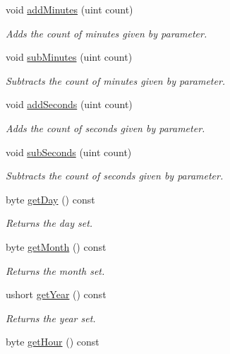 \begin{DoxyCompactItemize}
void \mbox{\hyperlink{class_date_time_a1da975e9de48724cc5c0b08dbfdb1b3c}{add\+Minutes}} (uint count)
\begin{DoxyCompactList}\small\item\em Adds the count of minutes given by parameter. \end{DoxyCompactList}\item 
void \mbox{\hyperlink{class_date_time_a5046fae9b637fc3dc994fb5544133585}{sub\+Minutes}} (uint count)
\begin{DoxyCompactList}\small\item\em Subtracts the count of minutes given by parameter. \end{DoxyCompactList}\item 
void \mbox{\hyperlink{class_date_time_a79bda8c555092ea62255498f86a07655}{add\+Seconds}} (uint count)
\begin{DoxyCompactList}\small\item\em Adds the count of seconds given by parameter. \end{DoxyCompactList}\item 
void \mbox{\hyperlink{class_date_time_a985cb277733445af6b172ac9ec2630e9}{sub\+Seconds}} (uint count)
\begin{DoxyCompactList}\small\item\em Subtracts the count of seconds given by parameter. \end{DoxyCompactList}\item 
byte \mbox{\hyperlink{class_date_time_a3ffb237255a73bbe9f8000d18c870ea8}{get\+Day}} () const
\begin{DoxyCompactList}\small\item\em Returns the day set. \end{DoxyCompactList}\item 
byte \mbox{\hyperlink{class_date_time_a18d5987a6def22fa88302cdb50941add}{get\+Month}} () const
\begin{DoxyCompactList}\small\item\em Returns the month set. \end{DoxyCompactList}\item 
ushort \mbox{\hyperlink{class_date_time_a5bab8648961a46a2a3cbca3868efecce}{get\+Year}} () const
\begin{DoxyCompactList}\small\item\em Returns the year set. \end{DoxyCompactList}\item 
byte \mbox{\hyperlink{class_date_time_ada00db60b48e636102d509a7b1b30296}{get\+Hour}} () const

\end{DoxyCompactItemize}
